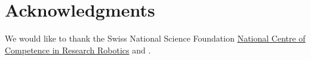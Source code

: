 \documentclass{sig-alternate-05-2015}
\begin{document}
\section{Acknowledgments}
We would like to thank the Swiss National Science Foundation 
\href{http://www.nccr-robotics.ch/}{National Centre of Competence in Research 
Robotics} and .

%
%  
\end{document}
